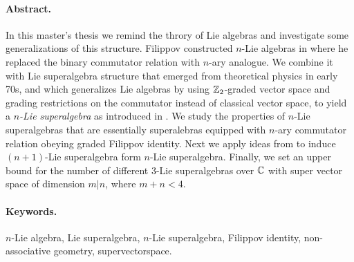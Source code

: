 \paragraph{Abstract.}
    In this master’s thesis we remind the throry of Lie algebras and
    investigate some generalizations of this structure. Filippov constructed
    $n$-Lie algebras in \cite{filippov1985} where he replaced the binary
    commutator relation with $n$-ary analogue. We combine it with
    Lie superalgebra structure that emerged from theoretical
    physics in early 70s, and which generalizes Lie algebras by using
    $\mathbb{Z}_2$-graded vector space and grading restrictions on the commutator
    instead of classical vector space, to yield a \emph{$n$-Lie superalgebra}
    as introduced in \cite{Abramov:2014}.
    We study the properties of $n$-Lie superalgebras that are essentially
    superalebras equipped with $n$-ary commutator relation obeying graded
    Filippov identity. Next we apply ideas from
    \cite{Abramov:2014,AKMS:2014} to induce $(n+1)$-Lie superalgebra form
    $n$-Lie superalgebra. Finally, we set an upper bound for the number of
    different $3$-Lie superalgebras over $\mathbb{C}$ with super vector space of
    dimension $m|n$, where $m+n < 4$.
\paragraph{Keywords.}
    $n$-Lie algebra, Lie superalgebra, $n$-Lie superalgebra,
    Filippov identity, non-associative geometry, supervectorspace.